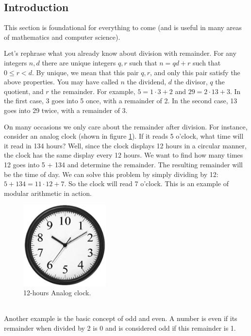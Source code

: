 \documentclass[12 pt]{article}
\begin{document}
\subsection{Introduction}
This section is foundational for everything to come (and is useful in many areas of mathematics and computer science).

Let's rephrase what you already know about division with remainder. For any integers $n,d$ there are unique integers $q,r$ such that $n=qd+r$ such that $0 \leq r<d$. By unique, we mean that this pair $q,r$, and only this pair satisfy the above properties. You may have called $n$ the dividend, $d$ the divisor, $q$ the quotient, and $r$ the remainder. For example, $5=1\cdot3+2$ and $29=2\cdot 13+3$. In the first case, 3 goes into 5 once, with a remainder of 2. In the second case, 13 goes into 29 twice, with a remainder of 3.

On many occasions we only care about the remainder after division. For instance, consider an analog clock (shown in figure \ref{fig:clock}). If it reads 5 o'clock, what time will it read in 134 hours? Well, since the clock displays 12 hours in a circular manner, the clock has the same display every 12 hours. We want to find how many times 12 goes into 5 + 134 and determine the remainder. The resulting remainder will be the time of day. We can solve this problem by simply dividing by 12: $5+134=11\cdot12+7$.  So the clock will read 7 o'clock. This is an example of modular arithmetic in action.
\\
\begin{figure}[h]
\begin{center}
\includegraphics[width=0.4\textwidth]{GTM_Clip_Art_Clock}
\caption{12-hours Analog clock.}
\label{fig:clock}
\end{center}
\end{figure}
\\
Another example is the basic concept of odd and even. A number is even if its remainder when divided by 2 is 0 and is considered odd if this remainder is 1.
\end{document}
